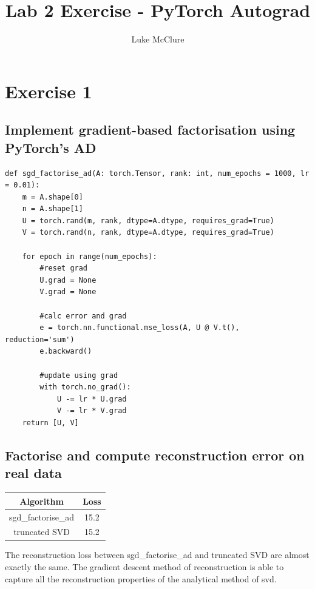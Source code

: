 \documentclass[sigconf]{acmart}
\begin{document}
\title{Lab 2 Exercise - PyTorch Autograd}
\author{Luke McClure}

\maketitle
\pagestyle{myheadings}
\section{Exercise 1}
\subsection{Implement gradient-based factorisation using PyTorch's AD}
\begin{listing}[H]
    \begin{verbatim}
def sgd_factorise_ad(A: torch.Tensor, rank: int, num_epochs = 1000, lr = 0.01):
    m = A.shape[0]
    n = A.shape[1]
    U = torch.rand(m, rank, dtype=A.dtype, requires_grad=True)
    V = torch.rand(n, rank, dtype=A.dtype, requires_grad=True)

    for epoch in range(num_epochs):
        #reset grad
        U.grad = None
        V.grad = None

        #calc error and grad
        e = torch.nn.functional.mse_loss(A, U @ V.t(), reduction='sum')
        e.backward()

        #update using grad
        with torch.no_grad():
            U -= lr * U.grad
            V -= lr * V.grad
    return [U, V]
    \end{verbatim}
\end{listing}
\subsection{Factorise and compute reconstruction error on real data} 
\begin{center}
    \begin{tabular}{| c c |}
        \hline
        Algorithm & Loss \\ 
        \hline\hline
        sgd\_factorise\_ad & 15.2 \\
        truncated SVD & 15.2\\
        \hline      
    \end{tabular}
\end{center}
The reconstruction loss between sgd\_factorise\_ad and truncated SVD are almost exactly the same. The gradient descent method of reconstruction is able to capture all the reconstruction properties of the analytical method of svd. 
\end{document}
